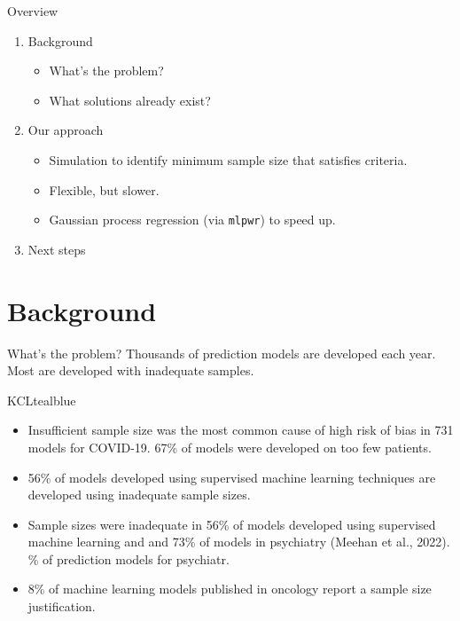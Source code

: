 \documentclass[11pt]{beamer}
\begin{document}
\begin{frame}[t]{Overview}
	\begin{enumerate}
		\item Background
		      \begin{itemize}
			      \item What's the problem?
			      \item What solutions already exist?
		      \end{itemize}
		\item Our approach
		      \begin{itemize}
			      \item Simulation to identify minimum sample size that satisfies criteria.
			      \item Flexible, but slower.
			      \item Gaussian process regression (via \texttt{mlpwr}) to speed up.
		      \end{itemize}
		\item Next steps
	\end{enumerate}
\end{frame}

\section{Background}

\begin{frame}[t]{What's the problem?}
    Thousands of prediction models are developed each year. Most are developed with inadequate samples.

	\begin{cbox}{KCLtealblue}{}
		\begin{itemize}
  \item Insufficient sample size was the most common cause of high risk of bias in 731 models for COVID-19.\autocite{wynants2020} 67\% of models were developed on too few
			      patients.
			\item 56\% of models developed using supervised machine learning
			      techniques are developed using inadequate sample
			      sizes\autocite{navarro2021}.
         \item Sample sizes were inadequate in 56\% of models developed using supervised machine learning\autocite{navarro2021} and and 73\% of models in psychiatry (Meehan et al., 2022). \% of prediction models for psychiatr\autocite{meehan2022}.
			\item 8\% of machine learning models published in oncology report a
			      sample size justification\autocite{dhiman2022}.
		\end{itemize}
	\end{cbox}
\end{frame}
\end{document}
